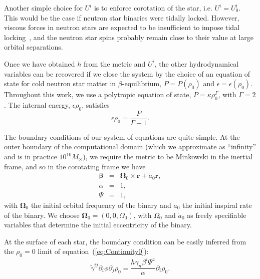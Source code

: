 {Another simple choice for $U^i$ is to enforce corotation of the star,
i.e. $U^i=U^i_0$. This would be the case if neutron star binaries were
tidally locked.  However, viscous forces in neutron stars are expected
to be insufficient to impose tidal locking~\cite{BildstenCutler1992},
and the neutron star spins probably remain close to their value at
large orbital separations.

Once we have obtained $h$ from the metric and $U^i$, the other
hydrodynamical variables can be recovered if we close the system by the
choice of an equation of state for cold neutron star matter in
$\beta$-equilibrium, $P = P(\rho_0)$ and $\epsilon=\epsilon(\rho_0)$.
Throughout this work, we use a polytropic equation of state, $P=\kappa\rho_0^\Gamma$, with $\Gamma=2$. The internal energy, $\epsilon\rho_0$, satisfies 
\begin{equation}
\epsilon\rho_0=\frac{P}{\Gamma-1}.
\end{equation}

The boundary conditions of our system of equations are quite
simple. At the outer boundary of the computational domain (which we
approximate as ``infinity'' and is in practice $10^{10}M_{\odot}$), we require the metric to be Minkowski
in the inertial frame, and so in the corotating frame we have
\begin{eqnarray}
{\bm \beta} &=& {\bm \Omega}_0 \times {\bm r} + \dot a_0 {\bm
  r},\\ \alpha &=& 1,\\ \Psi &=& 1,
\end{eqnarray}
with ${\bm \Omega}_0$ the initial orbital frequency of the binary and
$\dot{a}_0$ the initial inspiral rate of the binary. We choose ${\bm
  \Omega}_0=(0,0,\Omega_0)$, with $\Omega_0$ and $\dot{a}_0$ as freely
specifiable variables that determine the initial eccentricity of the
binary.

At the surface of each star, the boundary condition can be easily
inferred from the $\rho_0=0$ limit of equation~(\ref{eq:Continuity0}):
\begin{equation}
\tilde{\gamma}^{ij}\partial_i\phi\partial_j\rho_0 =
\frac{h\gamma_n\beta^{i}\Psi^4}{\alpha}\partial_i\rho_0.
\end{equation}

}
